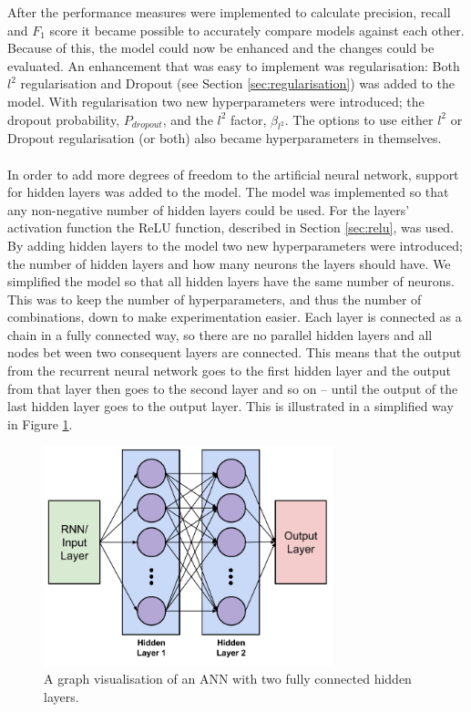 \label{sec:enhacing_the_model}
After the performance measures were implemented to calculate precision, recall and $F_1$ score it became possible to accurately compare models against each other. Because of this, the model could now be enhanced and the changes could be evaluated. An enhancement that was easy to implement was regularisation: Both $l^2$ regularisation and Dropout (see Section \ref{sec:regularisation}) was added to the model. With regularisation two new hyperparameters were introduced; the dropout probability, $P_{dropout}$, and the $l^2$ factor, $\beta_{l^2}$. The options to use either $l^2$ or Dropout regularisation (or both) also became hyperparameters in themselves.
\\\\
In order to add more degrees of freedom to the artificial neural network, support for hidden layers was added to the model. The model was implemented so that any non-negative number of hidden layers could be used. For the layers' activation function the ReLU function, described in Section \ref{sec:relu}, was used. By adding hidden layers to the model two new hyperparameters were introduced; the number of hidden layers and how many neurons the layers should have. We simplified the model so that all hidden layers have the same number of neurons. This was to keep the number of hyperparameters, and thus the number of combinations, down to make experimentation easier. Each layer is connected as a chain in a fully connected way, so there are no parallel hidden layers and all nodes between two consequent layers are connected. This means that the output from the recurrent neural network goes to the first hidden layer and the output from that layer then goes to the second layer and so on -- until the output of the last hidden layer goes to the output layer. This is illustrated in a simplified way in Figure \ref{fig:ann_hidden_layers}.
\begin{figure}[h!]
    \centering
    \includegraphics[width=0.75\textwidth]{figure/method/ann_hidden_layers}
    \caption{A graph visualisation of an ANN with two fully connected hidden layers.}
    \label{fig:ann_hidden_layers}
\end{figure}
